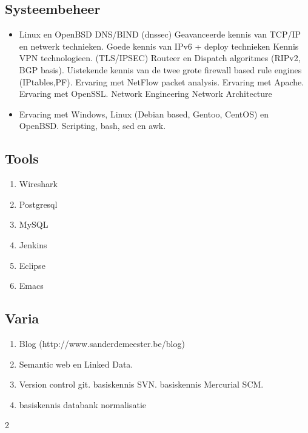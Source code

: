 \documentclass[margin, 10pt]{res} %
\begin{document}
\subsection{Systeembeheer}
\begin{itemize}
\item Linux en OpenBSD
\subitem DNS/BIND (dnssec)
\subitem Geavanceerde kennis van TCP/IP en netwerk technieken.
\subitem Goede kennis van IPv6 + deploy technieken
\subitem Kennis VPN technologieen. (TLS/IPSEC)
\subitem Routeer en Dispatch algoritmes (RIPv2, BGP basis).
\subitem Uistekende kennis van de twee grote firewall based rule engines (IPtables,PF).
\subitem Ervaring met NetFlow packet analysis.
\subitem Ervaring met Apache.
\subitem Ervaring met OpenSSL.
\subitem Network Engineering
\subitem Network Architecture
\item Ervaring met Windows, Linux (Debian based, Gentoo, CentOS) en OpenBSD.
\subitem Scripting, bash, sed en awk.
\end{itemize}
\begin{multicols}{2}
\subsection*{Tools}
\begin{enumerate}
\item[] Wireshark
\item[] Postgresql
\item[] MySQL
\item[] Jenkins
\item[] Eclipse
\item[] Emacs
\end{enumerate}
\subsection{Varia}
\begin{enumerate}
\item[] Blog (http://www.sanderdemeester.be/blog)
\item[] Semantic web en Linked Data.
\item[] Version control
\subitem git.
\subitem basiskennis SVN.
\subitem basiskennis Mercurial SCM.
\item[] basiskennis databank normalisatie
\end{enumerate}
\end{multicols}{2}
\end{document}
